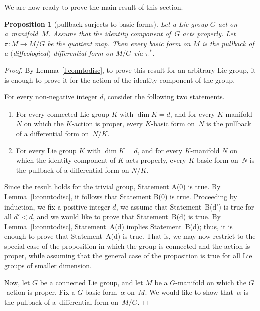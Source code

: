 \documentclass[11pt]{article}
\numberwithin{equation}{section}
\newtheorem{Proposition}[Theorem]{Proposition}
\newcommand{\hypref}[2]{{#2~\ref{#1}}}
\begin{document}
We are now ready to prove the main result of this section.

\begin{Proposition}[pullback surjects to basic forms]
\label{p:geomquot}
Let a Lie group $G$ act on a~mani\-fold~$M$.
Assume that the identity component of~$G$ acts properly.
Let $\pi \colon M \to M/G$ be the quotient map.
Then every basic form on $M$ is the pullback of a $($diffeological$)$ differential
form on $M/G$ via $\pi^*$.
\end{Proposition}

\begin{proof}
By \hypref{l:conntodisc}{Lemma}, to prove this result
for an arbitrary Lie group, it is enough to prove it
for the action of the identity component of the group.

For every non-negative integer $d$, consider the following two statements.
\begin{enumerate}\itemsep=0pt
\item[A(d):]
For every connected Lie group $K$ with $\dim K = d$,
and for every $K$-manifold $N$ on which the $K$-action is proper,
every $K$-basic form on~$N$ is the pullback of a dif\/ferential form on~$N/K$.

\item[B(d):]
For every Lie group $K$ with $\dim K = d$,
and for every $K$-manifold $N$ on which the identity component of $K$
acts properly, every $K$-basic form on~$N$ is the pullback
of a dif\/ferential form on $N/K$.
\end{enumerate}

Since the result holds for the trivial group, Statement A(0) is true.
By \hypref{l:conntodisc}{Lemma}, it follows that Statement B(0) is true.
Proceeding by induction, we f\/ix a positive integer $d$,
we assume that Statement~B(d$'$) is true for all $d' < d$,
and we would like to prove that Statement~B(d) is true.
By \hypref{l:conntodisc}{Lemma}, Statement~A(d) implies Statement~B(d);
thus, it is enough to prove that Statement~A(d) is true.
That is, we may now restrict to the special case of the proposition
in which the group is connected and the action is proper,
while assuming that the general case of the proposition is true
for all Lie groups of smaller dimension.

Now, let $G$ be a connected Lie group,
and let $M$ be a $G$-manifold on which the $G$-action is proper.
Fix a $G$-basic form~$\alpha$ on~$M$.
We would like to show that~$\alpha$ is the pullback of a~dif\/ferential form
on~$M/G$.


\end{proof}
\end{document}

